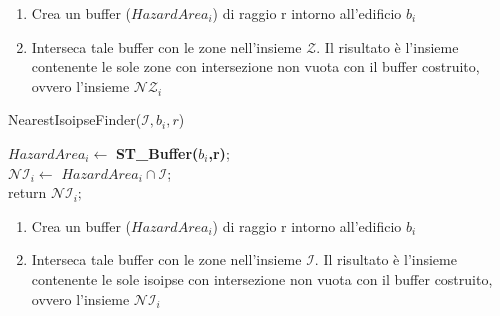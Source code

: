 \begin{enumerate}
	\item Crea un buffer ($ HazardArea_i $) di raggio r intorno all'edificio $b_i$
	\item Interseca tale buffer con le zone nell’insieme $\mathcal{Z}$. Il risultato è l’insieme contenente le sole zone con intersezione non vuota con il buffer costruito, ovvero l’insieme  $\mathcal{NZ}_i$
\end{enumerate}

\begin{algorithm}[H]
	
	
	\IncMargin{1em}
	\caption{NearestIsoipseFinder($\mathcal{I},b_i,r$)}
	\label{alg:two}
	\BlankLine
	\SetAlgoNoLine
	$  HazardArea_i   \leftarrow $ \textbf{ST\_Buffer($b_i$,r)}; \\
	$ \mathcal{NI}_i \leftarrow $ $HazardArea_i \cap \mathcal{I} $; \\
	return $\mathcal{NI}_i;$
\end{algorithm}
\begin{enumerate}
	\item Crea un buffer ($ HazardArea_i $) di raggio r intorno all'edificio $b_i$
	\item Interseca tale buffer con le zone nell’insieme $\mathcal{I}$. Il risultato è l’insieme contenente le sole isoipse con intersezione non vuota con il buffer costruito, ovvero l’insieme  $\mathcal{NI}_i$
\end{enumerate}

